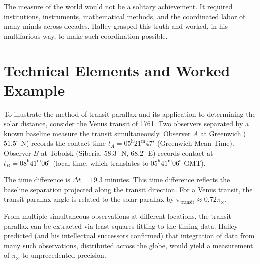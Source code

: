 The measure of the world would not be a solitary achievement. It required institutions, instruments, mathematical methods, and the coordinated labor of many minds across decades. Halley grasped this truth and worked, in his multifarious way, to make such coordination possible.

\section{Technical Elements and Worked Example}

To illustrate the method of transit parallax and its application to determining the solar distance, consider the Venus transit of 1761. Two observers separated by a known baseline measure the transit simultaneously. Observer $A$ at Greenwich ($51.5^{\circ}$ N) records the contact time $t_A = 05^{\text{h}} 21^{\text{m}} 47^{\text{s}}$ (Greenwich Mean Time). Observer $B$ at Tobolsk (Siberia, $58.3^{\circ}$ N, $68.2^{\circ}$ E) records contact at $t_B = 08^{\text{h}} 41^{\text{m}} 06^{\text{s}}$ (local time, which translates to $05^{\text{h}} 41^{\text{m}} 06^{\text{s}}$ GMT).

The time difference is $\Delta t = 19.3$ minutes. This time difference reflects the baseline separation projected along the transit direction. For a Venus transit, the transit parallax angle is related to the solar parallax by $\pi_{\text{transit}} \approx 0.72 \pi_{\odot}$.

From multiple simultaneous observations at different locations, the transit parallax can be extracted via least-squares fitting to the timing data. Halley predicted (and his intellectual successors confirmed) that integration of data from many such observations, distributed across the globe, would yield a measurement of $\pi_{\odot}$ to unprecedented precision.


